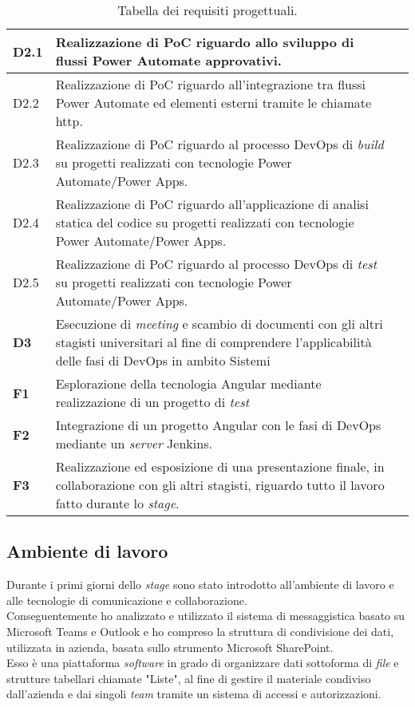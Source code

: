 \begin{table}[htbp]
\begin{tabularx}{\textwidth}{|l|X|l|}
    \hline D2.1  & Realizzazione di PoC riguardo allo sviluppo di flussi Power Automate approvativi.\\
    \hline D2.2  & Realizzazione di PoC riguardo all'integrazione tra flussi Power Automate ed elementi esterni tramite le chiamate \gls{http}.\\
    \hline D2.3  & Realizzazione di PoC riguardo al processo \gls{DevOps} di \emph{build} su progetti realizzati con tecnologie Power Automate/Power Apps.\\
    \hline D2.4  & Realizzazione di PoC riguardo all'applicazione di analisi statica del codice su progetti realizzati con tecnologie Power Automate/Power Apps.\\
    \hline D2.5  & Realizzazione di PoC riguardo al processo \gls{DevOps} di \emph{test} su progetti realizzati con tecnologie Power Automate/Power Apps.\\
    \hline \textbf{D3}  & Esecuzione di \emph{meeting} e scambio di documenti con gli altri stagisti universitari al fine di comprendere l'applicabilità delle fasi di \gls{DevOps} in ambito \gls{Sistemi} \\
    \hline
    \hline \textbf{F1}  & Esplorazione della tecnologia Angular mediante realizzazione di un progetto di \emph{test}\\
    \hline \textbf{F2}  & Integrazione di un progetto Angular con le fasi di \gls{DevOps} mediante un \emph{server} Jenkins.\\
    \hline \textbf{F3}  & Realizzazione ed esposizione di una presentazione finale, in collaborazione con gli altri stagisti, riguardo tutto il lavoro fatto durante lo \emph{stage}.\\
    \hline
    \end{tabularx}
    \caption{Tabella dei requisiti progettuali.}
\end{table}%
\subsection{Ambiente di lavoro}
Durante i primi giorni dello \emph{stage} sono stato introdotto all'ambiente di lavoro e alle tecnologie di comunicazione e collaborazione.\\
Conseguentemente ho analizzato e utilizzato il sistema di messaggistica basato su Microsoft Teams e Outlook e ho compreso la struttura di condivisione dei dati, utilizzata in azienda, basata sullo strumento Microsoft SharePoint.\\
Esso è una piattaforma \emph{software} in grado di organizzare dati sottoforma di \emph{file} e strutture tabellari chiamate "Liste", al fine di gestire il materiale condiviso dall'azienda e dai singoli \emph{team} tramite un sistema di accessi e autorizzazioni.\\

